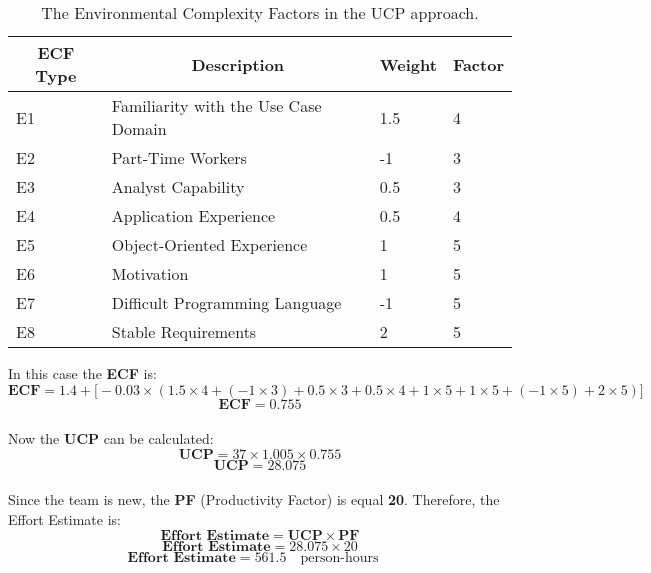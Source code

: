 \documentclass[12pt]{article}
\begin{document}
\begin{table}[h]
\centering
\begin{tabular}{|l|l|l|l|}
\hline
\multicolumn{1}{|c|}{\textbf{ECF Type}} & \multicolumn{1}{c|}{\textbf{Description}} & \multicolumn{1}{c|}{\textbf{Weight}} & \multicolumn{1}{c|}{\textbf{Factor}} \\ \hline
E1 & Familiarity with the Use Case Domain & 1.5 & 4 \\ \hline
E2 & Part-Time Workers & -1 & 3 \\ \hline
E3 & Analyst Capability & 0.5 & 3 \\ \hline
E4 & Application Experience & 0.5 & 4 \\ \hline
E5 & Object-Oriented Experience & 1 & 5 \\ \hline
E6 & Motivation & 1 & 5 \\ \hline
E7 & Difficult Programming Language & -1 & 5 \\ \hline
E8 & Stable Requirements & 2 & 5 \\ \hline
\end{tabular}
\caption{The Environmental Complexity Factors in the UCP approach.}
\end{table}

In this case the \textbf{ECF} is:
\begin{equation}
    \textbf{ECF} =  1.4 + \Big[-0.03 \times(1.5\times4+(-1\times3)+0.5\times3+0.5\times4+1\times5+1\times5+(-1\times5)+2\times5)\Big]
\end{equation}
\begin{equation}
    \textbf{ECF} =  0.755
\end{equation}\\

Now the \textbf{UCP} can be calculated:
\begin{equation}
    \textbf{UCP} = 37 \times 1.005 \times 0.755
\end{equation}
\begin{equation}
    \textbf{UCP} = 28.075
\end{equation}\\

Since the team is new, the \textbf{PF} (Productivity Factor) is equal \textbf{20}.
Therefore, the Effort Estimate is:
\begin{equation}
    \textbf{Effort Estimate} = \textbf{UCP} \times \textbf{PF}
\end{equation}
\begin{equation}
    \textbf{Effort Estimate} = 28.075 \times 20
\end{equation}
\begin{equation}
    \textbf{Effort Estimate} = 561.5 \quad \textrm{person-hours} \quad
\end{equation}\\
\end{document}

